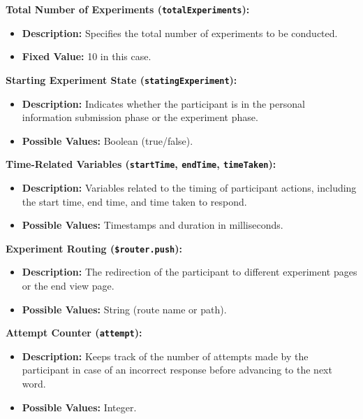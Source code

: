 \documentclass{article}
\begin{document}
\begin{tcolorbox}[title=Control Variables]

\textbf{Total Number of Experiments (\texttt{totalExperiments}):}
\begin{itemize}
    \item \textbf{Description:} Specifies the total number of experiments to be conducted.
    \item \textbf{Fixed Value:} 10 in this case.
\end{itemize}

\textbf{Starting Experiment State (\texttt{statingExperiment}):}
\begin{itemize}
    \item \textbf{Description:} Indicates whether the participant is in the personal information submission phase or the experiment phase.
    \item \textbf{Possible Values:} Boolean (true/false).
\end{itemize}

\end{tcolorbox}

\begin{tcolorbox}[title=Blocking Variables]

\textbf{Time-Related Variables (\texttt{startTime}, \texttt{endTime}, \texttt{timeTaken}):}
\begin{itemize}
    \item \textbf{Description:} Variables related to the timing of participant actions, including the start time, end time, and time taken to respond.
    \item \textbf{Possible Values:} Timestamps and duration in milliseconds.
\end{itemize}

\textbf{Experiment Routing (\texttt{\$router.push}):}
\begin{itemize}
    \item \textbf{Description:} The redirection of the participant to different experiment pages or the end view page.
    \item \textbf{Possible Values:} String (route name or path).
\end{itemize}

\textbf{Attempt Counter (\texttt{attempt}):}
\begin{itemize}
    \item \textbf{Description:} Keeps track of the number of attempts made by the participant in case of an incorrect response before advancing to the next word.
    \item \textbf{Possible Values:} Integer.
\end{itemize}

\end{tcolorbox}
\end{document}
